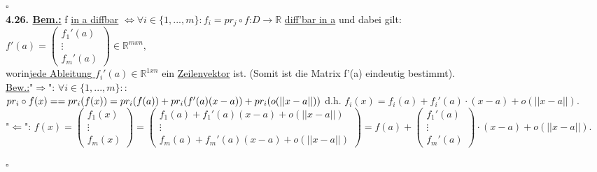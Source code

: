 \documentclass[]{scrartcl}
\begin{document}
\strut\hfill$\square$\\
\textbf{4.26. \underline{Bem.:}} f \ul{in a diffbar} $\Leftrightarrow \forall i 
\in \{1,...,m\}:$\ul{$f_i=pr_j\circ f$}:$D\rightarrow\mathbb{R}$ \ul{diff'bar 
in a} und dabei gilt:\\
$f'(a)=\begin{pmatrix}
	f_1'(a)\\\vdots\\f_m'(a)
\end{pmatrix}\in \mathbb{R}^{m x n},$\\
worin\ul{jede Ableitung $f_i'(a)\in\mathbb{R}^{1 x n}$} ein \ul{Zeilenvektor} 
ist. (Somit ist die Matrix f'(a) eindeutig bestimmt).\\
\underline{Bew.:}"$\Rightarrow$": $\forall i \in \{1,...,m\}::$\\
$pr_i \circ f(x)==pr_i(f(x))=pr_i(f(a))+pr_i(f'(a)(x-a))+pr_i(o(||x-a||))\\$
d.h. $f_i(x)= f_i(a)+f_i'(a)\cdot(x-a)+o(||x-a||).$\\
"$\Leftarrow$": $f(x)=\begin{pmatrix}
	f_1(x)\\\vdots\\f_m(x)
\end{pmatrix}=\begin{pmatrix}
f_1(a)+f_1'(a)(x-a)+o(||x-a||)\\\vdots\\f_m(a)+f_m'(a)(x-a)+o(||x-a||)
\end{pmatrix}=f(a)+\begin{pmatrix}
	f_1'(a)\\\vdots\\f_m'(a)
\end{pmatrix}\cdot(x-a)+o(||x-a||).$\\
\strut\hfill$\square$\\
\end{document}
